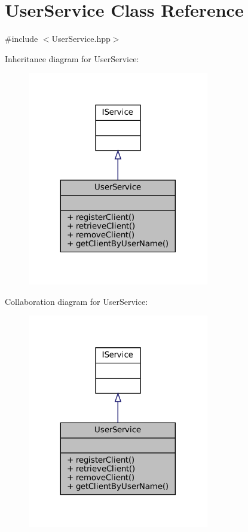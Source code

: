 \hypertarget{classUserService}{}\section{User\+Service Class Reference}
\label{classUserService}


{\ttfamily \#include $<$User\+Service.\+hpp$>$}



Inheritance diagram for User\+Service\+:
\nopagebreak
\begin{figure}[H]
\begin{center}
\leavevmode
\includegraphics[width=224pt]{classUserService__inherit__graph}
\end{center}
\end{figure}


Collaboration diagram for User\+Service\+:
\nopagebreak
\begin{figure}[H]
\begin{center}
\leavevmode
\includegraphics[width=224pt]{classUserService__coll__graph}
\end{center}
\end{figure}
